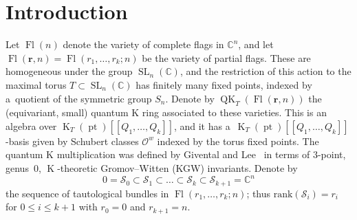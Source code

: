 \documentclass[pdftex]{sigma}
\numberwithin{equation}{section}
\theoremstyle{definition}
\DeclareMathOperator{\SL}{SL}
\DeclareMathOperator{\Fl}{Fl}
\DeclareMathOperator{\QK}{QK}
\DeclareMathOperator{\K}{K}
\DeclareMathOperator{\pt}{pt}
\newcommand{\bfr}{{\mathbf r}}
\newcommand{\C}{{\mathbb C}}
\newcommand{\cO}{{\mathcal O}}
\newcommand{\cS}{{\mathcal S}}
\begin{document}


\section{Introduction}

Let $\Fl(n)$ denote the variety of complete flags in $\C^n$, and let
$\Fl(\bfr,n)=\Fl(r_1, \dots, r_k; n)$ be the variety of partial flags. These are homogeneous under the group
$\SL_n(\C)$, and the restriction of this action to the maximal torus
$T \subset \SL_n(\C)$ has finitely many fixed points, indexed
by a~quotient of the symmetric group $S_n$.
Denote
by $\QK_T(\Fl(\bfr,n))$ the (equivariant, small) quantum K
ring associated to these varieties. This is an algebra over
$\K_T(\pt)[\![Q_1, \dots, Q_k]\!]$, and it has
a~$\K_T(\pt)[\![Q_1, \dots, Q_k]\!]$-basis given by Schubert classes
$\cO^w$ indexed by the torus fixed points. The quantum K multiplication
was defined by Givental and Lee~\cite{givental:onwdvv,lee:QK} in
terms of $3$-point, genus~$0$, $\K$-theoretic Gromov--Witten (KGW) invariants.
Denote by
\[ 0=\cS_0 \subset \cS_1 \subset \dots \subset \cS_k \subset \cS_{k+1}=\C^n \]
the sequence of tautological bundles in $\Fl(r_1, \dots, r_k; n)$; thus
$\mathrm{rank}(\cS_i)=r_i$ for $0\leq i\leq k+1$ with $r_0=0$ and $r_{k+1}=n$.
\end{document}

